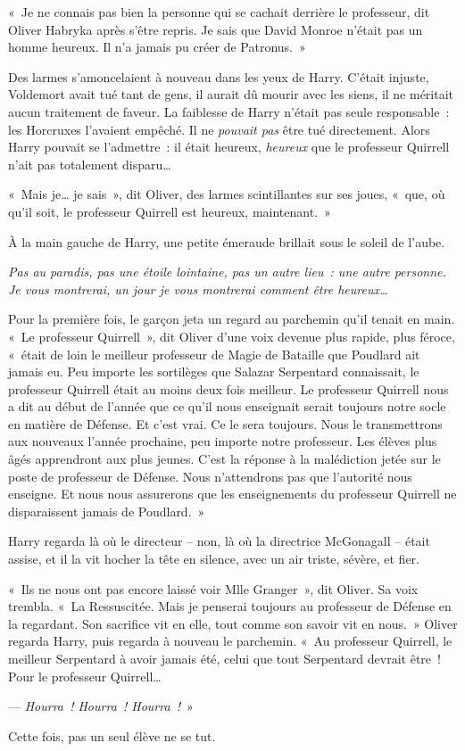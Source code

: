 «~Je ne connais pas bien la personne qui se cachait derrière le professeur, dit Oliver Habryka après s'être repris. Je sais que David Monroe n'était pas un homme heureux. Il n'a jamais pu créer de Patronus.~»

Des larmes s'amoncelaient à nouveau dans les yeux de Harry. C'était injuste, Voldemort avait tué tant de gens, il aurait dû mourir avec les siens, il ne méritait aucun traitement de faveur. La faiblesse de Harry n'était pas seule responsable~: les Horcruxes l'avaient empêché. Il ne \emph{pouvait pas} être tué directement. Alors Harry pouvait se l'admettre~: il était heureux, \emph{heureux} que le professeur Quirrell n'ait pas totalement disparu…

«~Mais je… je sais~», dit Oliver, des larmes scintillantes sur ses joues, «~que, où qu'il soit, le professeur Quirrell est heureux, maintenant.~»

À la main gauche de Harry, une petite émeraude brillait sous le soleil de l'aube.

\emph{Pas au paradis, pas une étoile lointaine, pas un autre lieu~: une autre personne. Je vous montrerai, un jour je vous montrerai comment être heureux…}

Pour la première fois, le garçon jeta un regard au parchemin qu'il tenait en main. «~Le professeur Quirrell~», dit Oliver d'une voix devenue plus rapide, plus féroce, «~était de loin le meilleur professeur de Magie de Bataille que Poudlard ait jamais eu. Peu importe les sortilèges que Salazar Serpentard connaissait, le professeur Quirrell était au moins deux fois meilleur. Le professeur Quirrell nous a dit au début de l'année que ce qu'il nous enseignait serait toujours notre socle en matière de Défense. Et c'est vrai. Ce le sera toujours. Nous le transmettrons aux nouveaux l'année prochaine, peu importe notre professeur. Les élèves plus âgés apprendront aux plus jeunes. C'est la réponse à la malédiction jetée sur le poste de professeur de Défense. Nous n'attendrons pas que l'autorité nous enseigne. Et nous nous assurerons que les enseignements du professeur Quirrell ne disparaissent jamais de Poudlard.~»

Harry regarda là où le directeur -- non, là où la directrice McGonagall -- était assise, et il la vit hocher la tête en silence, avec un air triste, sévère, et fier.

«~Ils ne nous ont pas encore laissé voir Mlle Granger~», dit Oliver. Sa voix trembla. «~La Ressuscitée. Mais je penserai toujours au professeur de Défense en la regardant. Son sacrifice vit en elle, tout comme son savoir vit en nous.~» Oliver regarda Harry, puis regarda à nouveau le parchemin. «~Au professeur Quirrell, le meilleur Serpentard à avoir jamais été, celui que tout Serpentard devrait être~! Pour le professeur Quirrell…

--- \emph{Hourra~! Hourra~! Hourra~!}~»

Cette fois, pas un seul élève ne se tut.
